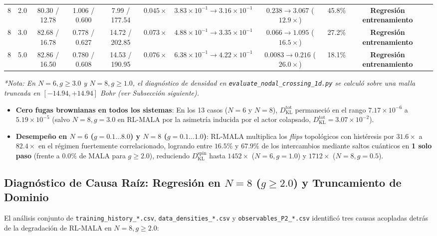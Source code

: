 \documentclass[10pt,a4paper]{article}
\begin{document}
\begin{table}[H]
\begin{adjustbox}{max width=\textwidth}
\begin{tabular}{ccccccccccl}
8 & 2.0 & 80.30 / 12.78 & 1.006 / 0.600 & 7.99 / 177.54 & $0.045\times$ & $3.83\!\times\!10^{-1} \to 3.16\!\times\!10^{-1}$ & $0.238 \to 3.067$ ($12.9\times$) & 45.8\% & \textbf{Regresión entrenamiento} \\
8 & 3.0 & 82.68 / 16.78 & 0.778 / 0.627 & 14.72 / 202.85 & $0.073\times$ & $4.88\!\times\!10^{-1} \to 3.35\!\times\!10^{-1}$ & $0.066 \to 1.095$ ($16.5\times$) & 27.2\% & \textbf{Regresión entrenamiento} \\
8 & 5.0 & 82.86 / 16.50 & 0.780 / 0.608 & 14.53 / 190.95 & $0.076\times$ & $6.38\!\times\!10^{-1} \to 4.22\!\times\!10^{-1}$ & $0.0083 \to 0.216$ ($26.0\times$) & 18.1\% & \textbf{Regresión entrenamiento} \\
\bottomrule
\end{tabular}
\end{adjustbox}
\end{table}

\textit{*Nota: En $N=6, g \ge 3.0$ y $N=8, g \ge 1.0$, el diagnóstico de densidad en \texttt{evaluate\_nodal\_crossing\_1d.py} se calculó sobre una malla truncada en $[-14.94, +14.94]$ Bohr (ver Subsección siguiente).}

\begin{itemize}
\item \textbf{Cero fugas brownianas en todos los sistemas}: En los 13 casos ($N=6$ y $N=8$), $D_{\mathrm{KL}}^{\mathrm{tot}}$ permaneció en el rango $7.17\times 10^{-6}$ a $5.19\times 10^{-5}$ (salvo $N=8, g=3.0$ en RL-MALA por la asimetría inducida por el actor colapsado, $D_{\mathrm{KL}}^{\mathrm{tot}} = 3.07\times 10^{-2}$).
\item \textbf{Desempeño en $N=6$ ($g=0.1 \dots 8.0$) y $N=8$ ($g=0.1 \dots 1.0$)}: RL-MALA multiplica los \textit{flips} topológicos con histéresis por $31.6\times$ a $82.4\times$ en el régimen fuertemente correlacionado, logrando entre $16.5\%$ y $67.9\%$ de los intercambios mediante saltos cuánticos en \textbf{1 solo paso} (frente a $0.0\%$ de MALA para $g \ge 2.0$), reduciendo $D_{\mathrm{KL}}^{\mathrm{spin}}$ hasta $1452\times$ ($N=6, g=1.0$) y $1712\times$ ($N=8, g=0.5$).
\end{itemize}

\subsection{Diagnóstico de Causa Raíz: Regresión en $N=8$ ($g \ge 2.0$) y Truncamiento de Dominio}

El análisis conjunto de \texttt{training\_history\_*.csv}, \texttt{data\_densities\_*.csv} y \texttt{observables\_P2\_*.csv} identificó tres causas acopladas detrás de la degradación de RL-MALA en $N=8, g \ge 2.0$:
\end{document}
